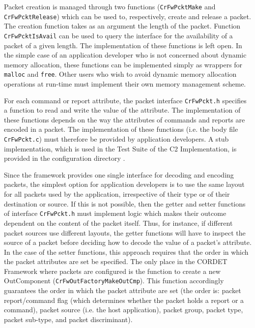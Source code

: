 \documentclass{pnp_article}
\begin{document}
Packet creation is managed through two functions (\texttt{CrFwPcktMake} and \texttt{CrFwPcktRelease}) which can be used to, respectively, create and release a packet. The creation function takes as an argument the length of the packet. Function \texttt{CrFwPcktIsAvail} can be used to query the interface for the availability of a packet of a given length. The implementation of these functions is left open. In the simple case of an application developer who is not concerned about dynamic memory allocation, these functions can be implemented simply as wrappers for \texttt{malloc} and \texttt{free}. Other users who wish to avoid dynamic memory allocation operations at run-time must implement their own memory management scheme.

For each command or report attribute, the packet interface \texttt{CrFwPckt.h} specifies a function to read and write the value of the attribute. The implementation of these functions depends on the way the attributes of commands and reports are encoded in a packet. The implementation of these functions (i.e. the body file \texttt{CrFwPckt.c}) must therefore be provided by application developers. A stub implementation, which is used in the Test Suite of the C2 Implementation, is provided in the configuration directory .

Since the framework provides one single interface for decoding and encoding packets, the simplest option for application developers is to use the same layout for all packets used by the application, irrespective of their type or of their destination or source. If this is not possible, then the getter and setter functions of interface \texttt{CrFwPckt.h} must implement logic which makes their outcome dependent on the content of the packet itself. Thus, for instance, if different packet sources use different layouts, the getter functions will have to inspect the source of a packet before deciding how to decode the value of a packet's attribute. In the case of the setter functions, this approach requires that the order in which the packet attributes are set be specified. The only place in the CORDET Framework where packets are configured is the function to create a new OutComponent (\texttt{CrFwOutFactoryMakeOutCmp}). This function accordingly guarantees the order in which the packet attribute are set (the order is: packet report/command flag (which determines whether the packet holds a report or a command), packet source (i.e. the host application), packet group, packet type, packet sub-type, and packet discriminant).
\end{document}
